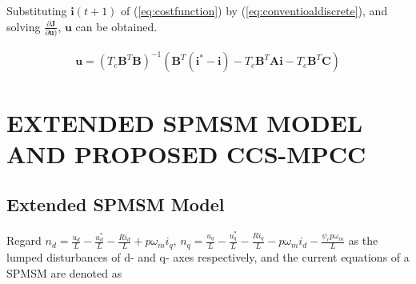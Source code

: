 \documentclass[a4paper, 8pt, twocolumn]{IEEEtran}
\begin{document}

Substituting $\bm{i}(t+1)$ of (\ref{eq:costfunction}) by (\ref{eq:conventioaldiscrete}), and solving $\frac{\partial{\bm{J}}}{\partial{\bm{u})}}$, $\bm{u}$ can be obtained.

\begin{equation}
\label{eq:conventionaldpcc}
\begin{align}
\bm{u}={(T_c \bm{B}^T \bm{B})^{-1}}(\bm{B}^T (\bm{i}^*-\bm{i})-T_c \bm{B}^T \bm{A} \bm{i}-T_c \bm{B}^T \bm{C})
\end{align}
\end{equation}
\fi

\section{EXTENDED SPMSM MODEL AND PROPOSED CCS-MPCC}
\subsection{Extended SPMSM Model}
Regard $n_{d} = \frac{u_d}{L} - \frac{u_{d}^*}{L} - \frac{R i_d}{L} + p \omega_m i_q$, $n_{q} = \frac{u_q}{L} - \frac{u_{q}^*}{L} - \frac{R i_q}{L} - p{\omega_m}i_d - \frac{\psi_r p \omega_m}{L}$ as the lumped disturbances of d- and q- axes respectively, and the current equations of a SPMSM are denoted as

\end{document}
